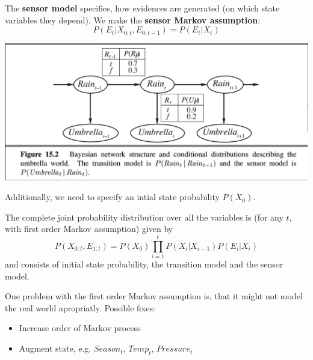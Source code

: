 \documentclass{scrartcl}
\begin{document}
\bigbreak

The \textbf{sensor model} specifies, how evidences are generated (on which state variables they depend). We make the \textbf{sensor Markov assumption}:
\[P(E_t | X_{0:t}, E_{0:t-1}) = P(E_t | X_t)\]

\begin{center}
    \includegraphics[scale=0.4]{img/transenmod.png}
\end{center}

Additionally, we need to specify an intial state probability \(P(X_0)\).

The complete joint probability distribution over all the variables is (for any \(t\), with first order Markov assumption) given by
\[P(X_{0:t}, E_{1:t}) = P(X_0) \prod_{i=1}^t P(X_i|X_{i-1}) P(E_i | X_i)\]
and consists of initial state probability, the transition model and the sensor model.

One problem with the first order Markov assumption is, that it might not model the real world apropriatly. Possible fixes:
\begin{itemize}
    \item
        Increase order of Markov process
    \item
        Augment state, e.g. \(Season_t\), \(Temp_t\), \(Pressure_t\) 
\end{itemize}
\end{document}
